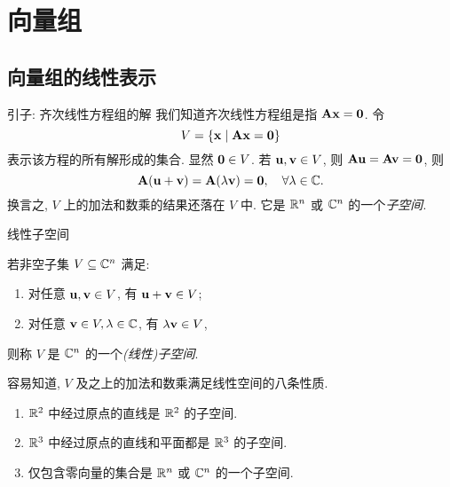 \section{向量组}

\subsection{向量组的线性表示}

\begin{frame}{引子: 齐次线性方程组的解}
	\onslide<+->
	我们知道齐次线性方程组是指 ${\mathbf{A}}{\mathbf{x}}={\bf0}$.
	\onslide<+->
	令
	\[V=\{{\mathbf{x}}\mid {\mathbf{A}}{\mathbf{x}}={\bf0}\}\]
	表示该方程的所有解形成的集合.
	\onslide<+->
	显然 ${\bf0}\in V$.
	\onslide<+->
	若 ${\mathbf{u}},{\mathbf{v}}\in V$, 则 ${\mathbf{A}}{\mathbf{u}}={\mathbf{A}}{\mathbf{v}}={\bf0}$, 则
	\[{\mathbf{A}}({\mathbf{u}}+{\mathbf{v}})={\mathbf{A}}(\lambda {\mathbf{v}})={\bf0},\quad \forall\lambda\in{\mathbb{C}}.\]
	\onslide<+->
	换言之, $V$ 上的加法和数乘的结果还落在 $V$ 中.
	\onslide<+->
	它是 ${\mathbb{R}}^n$ 或 ${\mathbb{C}}^n$ 的一个\emph{子空间}.
\end{frame}


\begin{frame}{线性子空间}
	\onslide<+->
	\begin{definition}
		若非空子集 $V\subseteq {\mathbb{C}}^n$ 满足:
		\begin{enumerate}
			\item 对任意 ${\mathbf{u}},{\mathbf{v}}\in V$, 有 ${\mathbf{u}}+{\mathbf{v}}\in V$;
			\item 对任意 ${\mathbf{v}}\in V,\lambda\in{\mathbb{C}}$, 有 $\lambda{\mathbf{v}}\in V$,
		\end{enumerate}
		则称 $V$ 是 ${\mathbb{C}}^n$ 的一个\emph{(线性)子空间}.
	\end{definition}
	\onslide<+->
	容易知道, $V$ 及之上的加法和数乘满足线性空间的八条性质.

	\onslide<+->
	\begin{example}
		\begin{enumerate}
			\item ${\mathbb{R}}^2$ 中经过原点的直线是 ${\mathbb{R}}^2$ 的子空间.
			\item ${\mathbb{R}}^3$ 中经过原点的直线和平面都是 ${\mathbb{R}}^3$ 的子空间. 
			\item 仅包含零向量的集合是 ${\mathbb{R}}^n$ 或 ${\mathbb{C}}^n$ 的一个子空间.
		\end{enumerate}
	\end{example}
\end{frame}


